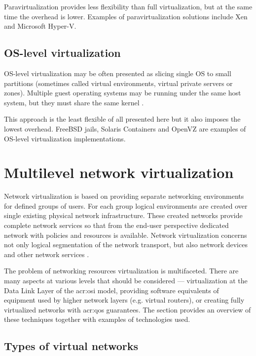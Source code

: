 \documentclass[11pt,openany]{book}
\begin{document}
        Paravirtualization provides less flexibility than full virtualization, but at the same time the overhead is
        lower. Examples of paravirtualization solutions include Xen and Microsoft Hyper-V.


      \subsection{OS-level virtualization}

        OS-level virtualization may be often presented as slicing single OS to small partitions (sometimes called
        virtual environments, virtual private servers or zones). Multiple guest operating systems may be running under
        the same host system, but they must share the same kernel \cite{turban}.

        This approach is the least flexible of all presented here but it also imposes the lowest overhead. FreeBSD
        jails, Solaris Containers and OpenVZ are examples of OS-level virtualization implementations.
                

    \section{Multilevel network virtualization}
    \label{sec:ctx:multi}

      Network virtualization is based on providing separate networking environments for defined groups of users. For
      each group logical environments are created over single existing physical network infrastructure. These created
      networks provide complete network services so that from the end-user perspective dedicated network with policies
      and resources is available. Network virtualization concerns not only logical segmentation of the network
      transport, but also network devices and other network services \cite{network_virt}.

      The problem of networking resources virtualization is multifaceted. There are many aspects at various levels that
      should be considered --- virtualization at the Data Link Layer of the \gls{acr:osi} model, providing software
      equivalents of equipment used by higher network layers (e.g. virtual routers), or creating fully virtualized
      networks with \gls{acr:qos} guarantees. The section provides an overview of these techniques together with
      examples of technologies used.


      \subsection{Types of virtual networks}
\end{document}
